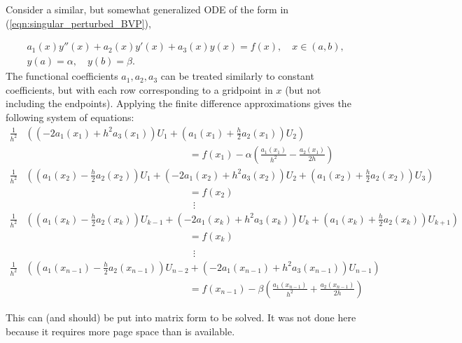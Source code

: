Consider a similar, but somewhat generalized ODE of the form in (\ref{eqn:singular_perturbed_BVP}),

\begin{align*}
	&{ } a_1(x)y''(x) +a_2(x)y'(x) +a_3(x)y(x) = f(x), \quad x \in (a,b),\\
	&{ } y(a) = \alpha, \quad y(b) = \beta.
\end{align*}
The functional coefficients $a_1, a_2, a_3$ can be treated similarly to constant coefficients, but with each row corresponding to a gridpoint in $x$ (but not including the endpoints).
Applying the finite difference approximations gives the following system of equations:
\begin{align*}
\frac{1}{h^2} & \left( \left(-2a_1(x_1) + h^2a_3(x_1)\right)U_1 + \left(a_1(x_1) + \frac{h}{2}a_2(x_1)\right)U_2  \right) \\
&\hspace{7cm} = f(x_1) - \alpha \left(\frac{a_1(x_1)}{h^2}- \frac{a_2(x_1)}{2h}\right) \\
\frac{1}{h^2} & \left( \left(a_1(x_2) - \frac{h}{2}a_2(x_2)\right) U_1 + \left(- 2a_1(x_2) + h^2a_3(x_2)\right)U_2  + \left(a_1(x_2) + \frac{h}{2}a_2(x_2) \right)U_3 \right) \\
&\hspace{7cm}= f(x_2)
\\
&\hspace{7cm}~~\vdots
\\
\frac{1}{h^2}& \left( \left(a_1(x_k) - \frac{h}{2}a_2(x_k)\right) U_{k-1} + \left(- 2a_1(x_k) + h^2a_3(x_k)\right)U_k + \left(a_1(x_k) + \frac{h}{2}a_2(x_k) \right)U_{k+1} \right) \\
&\hspace{7cm}= f(x_k) \\
\end{align*}\begin{align*}
&\hspace{7cm}~~\vdots \\
\frac{1}{h^2}& \left( \left(a_1(x_{n-1}) - \frac{h}{2}a_2(x_{n-1})\right) U_{n-2} + \left(- 2a_1(x_{n-1}) + h^2 a_3(x_{n-1})\right)U_{n-1} \right) \\
&\hspace{7cm}= f(x_{n-1})
- \beta\left(
\frac{a_1(x_{n-1})}{h^2}+ \frac{a_2(x_{n-1})}{2h}
\right)
\end{align*}

This can (and should) be put into matrix form to be solved.
It was not done here because it requires more page space than is available.

